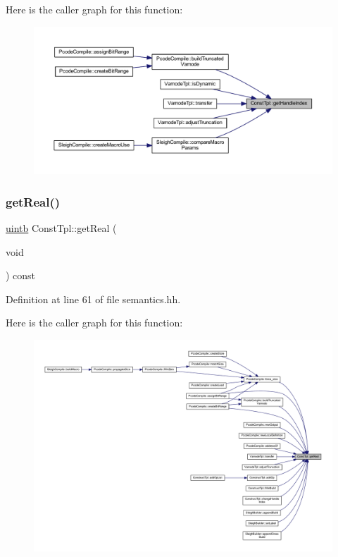 Here is the caller graph for this function\+:
\nopagebreak
\begin{figure}[H]
\begin{center}
\leavevmode
\includegraphics[width=350pt]{class_const_tpl_ae13b49fd91f96382b97c7b0d6901653f_icgraph}
\end{center}
\end{figure}
\mbox{\label{class_const_tpl_a456a8ce94fc3beba134ed54c6e2a5773}} 
\subsubsection{\texorpdfstring{getReal()}{getReal()}}
{\footnotesize\ttfamily \mbox{\hyperlink{types_8h_a2db313c5d32a12b01d26ac9b3bca178f}{uintb}} Const\+Tpl\+::get\+Real (\begin{DoxyParamCaption}\item[{void}]{ }\end{DoxyParamCaption}) const\hspace{0.3cm}{\ttfamily [inline]}}



Definition at line 61 of file semantics.\+hh.

Here is the caller graph for this function\+:
\nopagebreak
\begin{figure}[H]
\begin{center}
\leavevmode
\includegraphics[width=350pt]{class_const_tpl_a456a8ce94fc3beba134ed54c6e2a5773_icgraph}
\end{center}
\end{figure}
\mbox{\label{class_const_tpl_a4bc27aa15f85b5fb4a621a7488b9f6fc}} 
